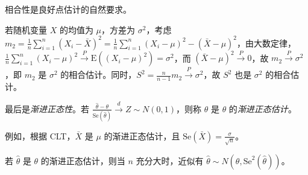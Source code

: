 \documentclass[../main.tex]{subfiles}
\begin{document}
相合性是良好点估计的自然要求。

\begin{example}
    若随机变量 $X$ 的均值为 $\mu$，方差为 $\sigma^2$，考虑 $m_2=\frac1n\sum_{i=1}^n(X_i-\bar X)^2=\frac1n\sum_{i=1}^n(X_i-\mu)^2-(\bar X-\mu)^2$，由大数定律，$\frac1n\sum_{i=1}^n(X_i-\mu)^2\overset{P}\rightarrow\mathrm E((X_i-\mu)^2)=\sigma^2$，而 $(\bar X-\mu)^2\overset{P}\rightarrow0$，故 $m_2\overset{P}\rightarrow\sigma^2$，即 $m_2$ 是 $\sigma^2$ 的相合估计。同时，$S^2=\frac n{n-1}m_2\overset{P}\rightarrow\sigma^2$，故 $S^2$ 也是 $\sigma^2$ 的相合估计。
\end{example}

最后是\emph{渐进正态性}。若 $\frac{\hat\theta-\theta}{\mathrm{Se}(\hat\theta)}\overset{d}\rightarrow Z\sim N(0,1)$，则称 $\hat\theta$ 是 $\theta$ 的\emph{渐进正态估计}。

例如，根据 CLT，$\bar X$ 是 $\mu$ 的渐进正态估计，且 $\mathrm{Se}(\bar X)=\frac{\sigma}{\sqrt n}$。

若 $\hat\theta$ 是 $\theta$ 的渐进正态估计，则当 $n$ 充分大时，近似有 $\hat\theta\sim N(\theta,\mathrm{Se}^2(\hat\theta))$。
\end{document}

